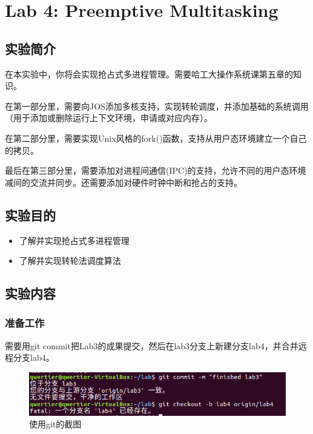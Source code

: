 \section{Lab 4: Preemptive Multitasking}

\subsection{实验简介}

在本实验中，你将会实现抢占式多进程管理。需要哈工大操作系统课第五章的知识。

在第一部分里，需要向JOS添加多核支持，实现转轮调度，并添加基础的系统调用（用于添加或删除运行上下文环境，申请或对应内存）。

在第二部分里，需要实现Unix风格的fork()函数，支持从用户态环境建立一个自己的拷贝。

最后在第三部分里，需要添加对进程间通信(IPC)的支持，允许不同的用户态环境减间的交流并同步。还需要添加对硬件时钟中断和抢占的支持。

\subsection{实验目的}

\begin{itemize}
\item 了解并实现抢占式多进程管理
\item 了解并实现转轮法调度算法
\end{itemize}

\subsection{实验内容}

\subsubsection{准备工作}

需要用git commit把Lab3的成果提交，然后在lab3分支上新建分支lab4，并合并远程分支lab4。

\begin{figure}[H]
  \centering
  \includegraphics[width=6in]{figures/lab4/git_commit.png}
  \caption{使用git的截图}\label{fig:lab1:git_commit}
\end{figure}

